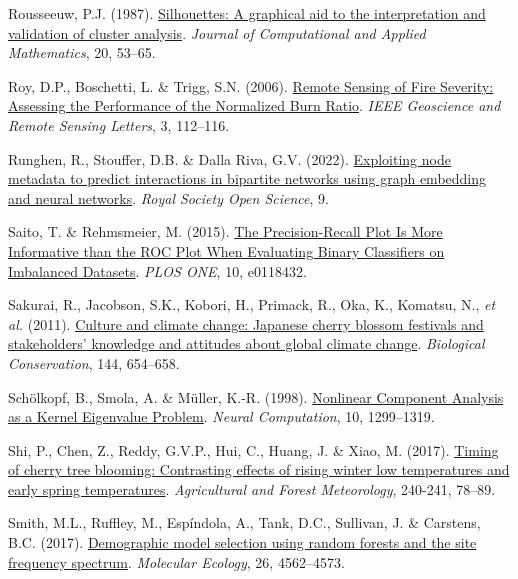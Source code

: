 \documentclass[
  letterpaper,
]{scrbook}
\newlength{\cslhangindent}
\newenvironment{CSLReferences}[2] %
 {\begin{list}{}{%
  \setlength{\itemindent}{0pt}
  \setlength{\leftmargin}{0pt}
  \setlength{\parsep}{0pt}
  \ifodd #1
   \setlength{\leftmargin}{\cslhangindent}
   \setlength{\itemindent}{-1\cslhangindent}
  \fi
  \setlength{\itemsep}{#2\baselineskip}}}
 {\end{list}}
\begin{document}
\begin{CSLReferences}{1}{0}
Rousseeuw, P.J. (1987).
\href{https://doi.org/10.1016/0377-0427(87)90125-7}{Silhouettes: A
graphical aid to the interpretation and validation of cluster analysis}.
\emph{Journal of Computational and Applied Mathematics}, 20, 53--65.

Roy, D.P., Boschetti, L. \& Trigg, S.N. (2006).
\href{https://doi.org/10.1109/lgrs.2005.858485}{Remote Sensing of Fire
Severity: Assessing the Performance of the Normalized Burn Ratio}.
\emph{IEEE Geoscience and Remote Sensing Letters}, 3, 112--116.

Runghen, R., Stouffer, D.B. \& Dalla Riva, G.V. (2022).
\href{https://doi.org/10.1098/rsos.220079}{Exploiting node metadata to
predict interactions in bipartite networks using graph embedding and
neural networks}. \emph{Royal Society Open Science}, 9.

Saito, T. \& Rehmsmeier, M. (2015).
\href{https://doi.org/10.1371/journal.pone.0118432}{The Precision-Recall
Plot Is More Informative than the ROC Plot When Evaluating Binary
Classifiers on Imbalanced Datasets}. \emph{PLOS ONE}, 10, e0118432.

Sakurai, R., Jacobson, S.K., Kobori, H., Primack, R., Oka, K., Komatsu,
N., \emph{et al.} (2011).
\href{https://doi.org/10.1016/j.biocon.2010.09.028}{Culture and climate
change: Japanese cherry blossom festivals and stakeholders{'} knowledge
and attitudes about global climate change}. \emph{Biological
Conservation}, 144, 654--658.

Schölkopf, B., Smola, A. \& Müller, K.-R. (1998).
\href{https://doi.org/10.1162/089976698300017467}{Nonlinear Component
Analysis as a Kernel Eigenvalue Problem}. \emph{Neural Computation}, 10,
1299--1319.

Shi, P., Chen, Z., Reddy, G.V.P., Hui, C., Huang, J. \& Xiao, M. (2017).
\href{https://doi.org/10.1016/j.agrformet.2017.04.001}{Timing of cherry
tree blooming: Contrasting effects of rising winter low temperatures and
early spring temperatures}. \emph{Agricultural and Forest Meteorology},
240-241, 78--89.

Smith, M.L., Ruffley, M., Espíndola, A., Tank, D.C., Sullivan, J. \&
Carstens, B.C. (2017).
\href{https://doi.org/10.1111/mec.14223}{Demographic model selection
using random forests and the site frequency spectrum}. \emph{Molecular
Ecology}, 26, 4562--4573.


\end{CSLReferences}
\end{document}
